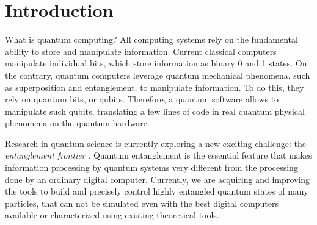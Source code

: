 \documentclass[11pt, a4paper, twoside, openright]{book}
\newenvironment{abstract}%
{\cleardoublepage%
\thispagestyle{empty}%
\null \vfill\begin{center}%
\bfseries \abstractname \end{center}}%
{\vfill\null}
\renewcommand{\'}[0]{\`}
\theoremstyle{definition}
\begin{document}


\tableofcontents


\pagestyle{plain}%

\chapter{Introduction}


What is quantum computing?
All computing systems rely on the fundamental ability to store and manipulate information. Current classical computers manipulate individual bits, which store information as binary 0 and 1 states. On the contrary, quantum computers leverage quantum mechanical phenomena, such as superposition and entanglement, to manipulate information. To do this, they rely on quantum bits, or qubits. Therefore, a quantum software allows to manipulate such qubits, translating a few lines of code in real quantum physical phenomena on the quantum hardware. 

Research in quantum science is currently exploring a new exciting challenge: the \textit{entanglement frontier} \cite{PreskillNote}. Quantum entanglement is the essential feature that makes information processing by quantum systems very different from the processing done by an ordinary digital computer. Currently, we are acquiring and improving the tools to build and precisely control highly entangled quantum states of many particles,  that can not be simulated even with the best digital computers available or characterized using existing theoretical tools.
\end{document}

